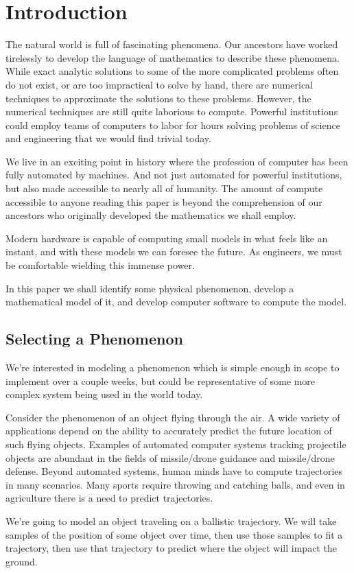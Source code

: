 \section{Introduction}

The natural world is full of fascinating phenomena. Our ancestors have worked tirelessly to develop the language of mathematics to describe these phenomena. While exact analytic solutions to some of the more complicated problems often do not exist, or are too impractical to solve by hand, there are numerical techniques to approximate the solutions to these problems. However, the numerical techniques are still quite laborious to compute. Powerful institutions could employ teams of computers to labor for hours solving problems of science and engineering that we would find trivial today. 

We live in an exciting point in history where the profession of computer has been fully automated by machines. And not just automated for powerful institutions, but also made accessible to nearly all of humanity. The amount of compute accessible to anyone reading this paper is beyond the comprehension of our ancestors who originally developed the mathematics we shall employ. 

Modern hardware is capable of computing small models in what feels like an instant, and with these models we can foresee the future. As engineers, we must be comfortable wielding this immense power. 

In this paper we shall identify some physical phenomenon, develop a mathematical model of it, and develop computer software to compute the model.

\subsection{Selecting a Phenomenon}

We're interested in modeling a phenomenon which is simple enough in scope to implement over a couple weeks, but could be representative of some more complex system being used in the world today. 

Consider the phenomenon of an object flying through the air. A wide variety of applications depend on the ability to accurately predict the future location of such flying objects. Examples of automated computer systems tracking projectile objects are abundant in the fields of missile/drone guidance and missile/drone defense. Beyond automated systems, human minds have to compute trajectories in many scenarios. Many sports require throwing and catching balls, and even in agriculture there is a need to predict trajectories.

We're going to model an object traveling on a ballistic trajectory. We will take samples of the position of some object over time, then use those samples to fit a trajectory, then use that trajectory to predict where the object will impact the ground.

